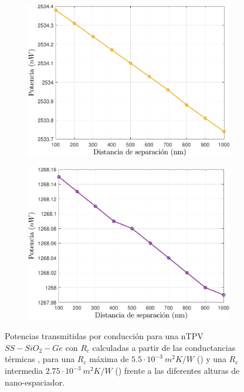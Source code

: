 \begin{figure}[H]
	\centering
	\begin{subfigure}[b]{0.49\textwidth}
		\centering
			\includegraphics[width=1.00\textwidth]{Prc_SsSiO2Ge_Inter.pdf}
		\caption{ }
		\label{fig:Prc_SsSiO2Ge_Inter}
	\end{subfigure}
	\hfill
	\begin{subfigure}[b]{0.49\textwidth}
		\centering
			\includegraphics[width=1.00\textwidth]{Prc_SsSiO2Ge_Max.pdf}
		\caption{ }
		\label{fig:Prc_SsSiO2Ge_Max}
	\end{subfigure}
	\caption[Potencias trasmitidas por conducción para una nTPV $SS-SiO_2-Ge$ con $R_c$ calculadas, con una $R_c$ máxima de  $5.5\cdot 10^{-3} \ m^2 K/W$ () y una $R_c$ intermedia $2.75\cdot 10^{-3} \ m^2 K/W$ () frente a las diferentes alturas de un nano-espaciadores.]{Potencias transmitidas por conducción para una nTPV $SS-SiO_2-Ge$ con $R_c$ calculadas a partir de las conductancias térmicas \cite{experimental_Rc_SS}, para una $R_c$ máxima de  $5.5\cdot 10^{-3} \ m^2 K/W$ () y una $R_c$ intermedia $2.75\cdot 10^{-3} \ m^2 K/W$ () frente a las diferentes alturas de nano-espaciador.}
	\label{fig:Pcond2_SsSiO2Ge}
\end{figure}
